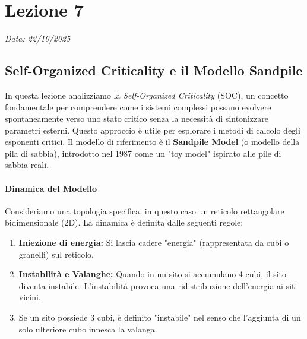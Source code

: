 \chapter{Lezione 7}
\label{chap:lezione_07} 

\begin{flushright}
\textit{Data: 22/10/2025}
\end{flushright}

\section{Self-Organized Criticality e il Modello Sandpile}

In questa lezione analizziamo la \textit{Self-Organized Criticality} (SOC), un concetto fondamentale per comprendere come i sistemi complessi possano evolvere spontaneamente verso uno stato critico senza la necessità di sintonizzare parametri esterni. Questo approccio è utile per esplorare i metodi di calcolo degli esponenti critici. Il modello di riferimento è il \textbf{Sandpile Model} (o modello della pila di sabbia), introdotto nel 1987 come un "toy model" ispirato alle pile di sabbia reali.

\subsubsection{Dinamica del Modello}
Consideriamo una topologia specifica, in questo caso un reticolo rettangolare bidimensionale (2D). La dinamica è definita dalle seguenti regole:
\begin{enumerate}
    \item \textbf{Iniezione di energia:} Si lascia cadere "energia" (rappresentata da cubi o granelli) sul reticolo.
    \item \textbf{Instabilità e Valanghe:} Quando in un sito si accumulano 4 cubi, il sito diventa instabile. L'instabilità provoca una ridistribuzione dell'energia ai siti vicini.
    \item Se un sito possiede 3 cubi, è definito "instabile" nel senso che l'aggiunta di un solo ulteriore cubo innesca la valanga.
\end{enumerate}

